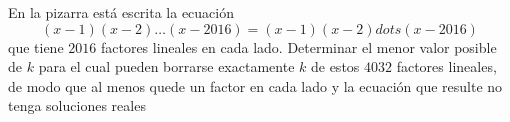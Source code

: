 En la pizarra está escrita la ecuación
\[(x - 1)(x - 2) \dots (x - 2016) = (x - 1)(x - 2) dots (x - 2016)\]
que tiene $2016$ factores lineales en cada lado. Determinar el menor valor posible de $k$ para el cual pueden borrarse exactamente $k$ de estos $4032$ factores lineales, de modo que al menos quede un factor en cada lado y la ecuación que resulte no tenga soluciones reales